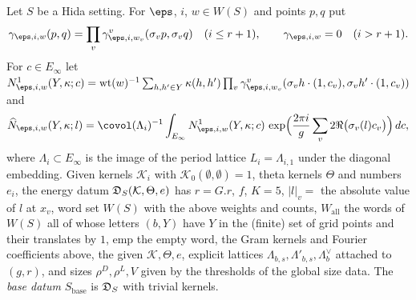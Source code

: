 \begin{definition}\label{pf:thmS-carrier:mkdata}
Let $S$ be a Hida setting. For $\eps$, $i$, $w\in W(S)$ and points $p,q$ put
\[
\gamma_{\eps,i,w}(p,q)=\prod_{v}\gamma^{v}_{\eps,i,w_v}(\sigma_vp,\sigma_vq)\quad(i\le r+1),\qquad
\gamma_{\eps,i,w}=0\quad(i>r+1).
\]
For $c\in E_\infty$ let $N^1_{\eps,i,w}(Y,\kappa;c)=\thmScarrierWt(w)^{-1}\sum_{h,h'\in Y}\kappa(h,h')\prod_v
\gamma^{v}_{\eps,i,w_v}(\sigma_vh\cdot(1,c_v),\sigma_vh'\cdot(1,c_v))$ and
\begin{equation}\label{eq:pf:thmS-carrier:Nhat}
\thmScarrierNhat_{\eps,i,w}(Y,\kappa;l)=\covol(\Lambda_i)^{-1}\int_{E_\infty}N^1_{\eps,i,w}(Y,\kappa;c)\,
\exp\Bigl(\frac{2\pi i}{g}\sum_v2\Re\bigl(\sigma_v(l)c_v\bigr)\Bigr)\,dc,
\end{equation}
where $\Lambda_i\subset E_\infty$ is the image of the period lattice $L_i=\Lambda_{i,1}$ under the diagonal embedding.
Given kernels $\mathcal K_i$ with $\mathcal K_0(\emptyset,\emptyset)=1$, theta kernels $\Theta$ and numbers $e_i$, the
energy datum $\mathfrak{D}_S(\mathcal K,\Theta,e)$ has $r=G.r$, $f$, $K=5$, $|l|_v=$ the absolute value of $l$ at
$x_v$, word set $W(S)$ with the above weights and counts, $W_{\mathrm{all}}$ the words of $W(S)$ all of whose letters
$(b,Y)$ have $Y$ in the (finite) set of grid points and their translates by $1$, $\mathrm{emp}$ the empty word, the Gram
kernels and Fourier coefficients above, the given $\mathcal K,\Theta,e$, explicit lattices
$\Lambda_{b,s},\Lambda'_{b,s},\Lambda^\vee_b$ attached to $(g,r)$, and sizes $\rho^D,\rho^L,V$ given by the thresholds
of the global size data. The \emph{base datum} $S_{\mathrm{base}}$ is $\mathfrak{D}_S$ with trivial kernels.
\end{definition}


